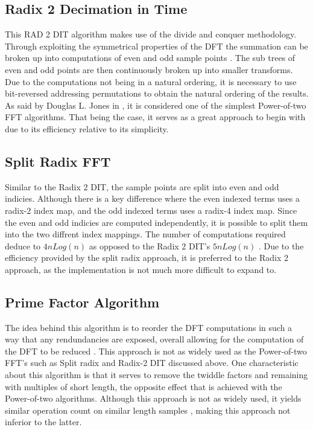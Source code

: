 \documentclass[journal]{IEEEtran}
\begin{document}
	\subsection{Radix 2 Decimation in Time}
		\par{
			This RAD 2 DIT algorithm makes use of the divide and conquer methodology. Through exploiting 
			the symmetrical properties of the DFT the summation can be broken up into computations of even 
			and odd sample points \cite{Soni}. The sub trees of even and odd points are then continuously 
			broken up into smaller transforms. Due to the computations not being in a natural ordering,
			it is necessary to use bit-reversed addressing permutations to obtain the natural ordering of the results. As said by 
			Douglas L. Jones in \cite{Cnx}, it is considered one of the simplest Power-of-two FFT algorithms. 
			That being the case, it serves as a great approach to begin with due to its efficiency relative to 
			its simplicity.
		}
	\subsection{Split Radix FFT}
		\par{
			Similar to the Radix 2 DIT, the sample points are split into even and odd indicies. Although there is 
			a key difference where the even indexed terms uses a radix-2 index map, and the odd indexed terms uses 
			a radix-4 index map. Since the even and odd indicies are computed independently, it is possible to split 
			them into the two diffrent index mappings. The number of computations required deduce to ${4n Log(n)}$ 
			as opposed to the Radix 2 DIT's ${5n Log(n)}$ \cite{Soni}. Due to the efficiency provided by the split 
			radix approach, it is preferred to the Radix 2 approach, as the implementation is not much more difficult 
			to expand to.
		}

	\subsection{Prime Factor Algorithm}
		\par{
			The idea behind this algorithm is to reorder the DFT computations in such a way that any rendundancies 
			are exposed, overall allowing for the computation of the DFT to be reduced \cite{Cnx}. 
			This approach is not as widely used as the Power-of-two FFT's such as Split radix and Radix-2 DIT discussed above. 
			One characteristic about this algorithm is that it serves to remove the twiddle factors and remaining with multiples 
			of short length, the opposite effect that is achieved with the Power-of-two algorithms. Although this approach is not 
			as widely used, it yields similar operation count on similar length samples \cite{Cnx}, making this approach not 
			inferior to the latter.
		}
\end{document}
